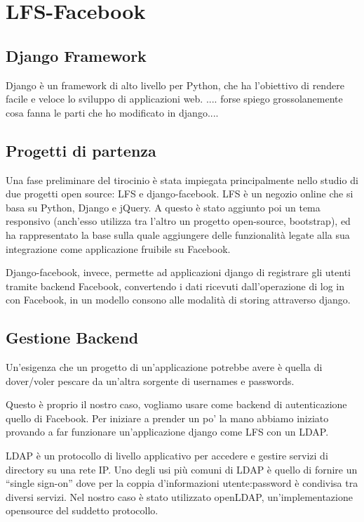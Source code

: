 \chapter{LFS-Facebook}

\section{Django Framework}
Django è un framework di alto livello per Python, che ha l'obiettivo di rendere facile e veloce lo sviluppo di applicazioni web.
.... forse spiego grossolanemente cosa fanna le parti che ho modificato in django....
 
\section{Progetti di partenza}
Una fase preliminare del tirocinio è stata impiegata principalmente nello studio di due progetti open source: LFS e django-facebook.
LFS è un negozio online che  si basa su Python, Django e jQuery. A questo è stato aggiunto poi un tema responsivo (anch'esso utilizza tra l'altro un progetto open-source, bootstrap), ed ha rappresentato la base sulla quale aggiungere delle funzionalità legate alla sua integrazione come applicazione fruibile su Facebook. 

Django-facebook, invece, permette ad applicazioni django di registrare gli utenti tramite backend Facebook, convertendo i dati ricevuti dall'operazione di log in con Facebook, in un modello consono alle modalità di storing attraverso django.

\section{Gestione Backend}
Un'esigenza che un progetto di un'applicazione potrebbe avere è quella di dover/voler pescare da un'altra sorgente di usernames e passwords.

Questo è proprio il nostro caso, vogliamo usare come backend di autenticazione quello di Facebook.
Per iniziare a prender un po' la mano abbiamo iniziato provando a far funzionare un'applicazione django come LFS con un LDAP. 

LDAP è un protocollo di livello applicativo per accedere e gestire servizi di directory su una rete IP. Uno degli usi più comuni di LDAP è quello di fornire un “single sign-on” dove per la coppia d'informazioni utente:password è condivisa tra diversi servizi.
Nel nostro caso è stato utilizzato openLDAP, un'implementazione opensource del suddetto protocollo.



